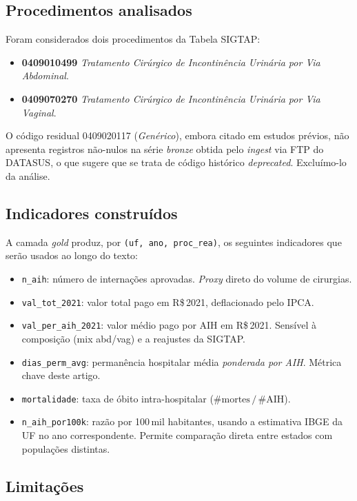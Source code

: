 \documentclass[12pt,a4paper,oneside]{article}
\newcommand{\rs}{R\$\,}
\begin{document}
\subsection{Procedimentos analisados}

Foram considerados dois procedimentos da Tabela SIGTAP:
\begin{itemize}
\item \textbf{0409010499} \textemdash{} \textit{Tratamento
Cirúrgico de Incontinência Urinária por Via Abdominal}.
\item \textbf{0409070270} \textemdash{} \textit{Tratamento
Cirúrgico de Incontinência Urinária por Via Vaginal}.
\end{itemize}

O código residual 0409020117 (\textit{Genérico}), embora citado
em estudos prévios, não apresenta registros não-nulos na série
\textit{bronze} obtida pelo \textit{ingest} via FTP do DATASUS, o
que sugere que se trata de código histórico \textit{deprecated}.
Excluímo-lo da análise.

\subsection{Indicadores construídos}

A camada \textit{gold} produz, por \texttt{(uf, ano, proc\_rea)},
os seguintes indicadores que serão usados ao longo do texto:

\begin{itemize}
\item \texttt{n\_aih}: número de internações aprovadas. \textit{Proxy}
direto do volume de cirurgias.
\item \texttt{val\_tot\_2021}: valor total pago em \rs 2021,
deflacionado pelo IPCA.
\item \texttt{val\_per\_aih\_2021}: valor médio pago por AIH em
\rs 2021. Sensível à composição (mix abd/vag) e a reajustes da
SIGTAP.
\item \texttt{dias\_perm\_avg}: permanência hospitalar média
\textit{ponderada por AIH}. Métrica chave deste artigo.
\item \texttt{mortalidade}: taxa de óbito intra-hospitalar
($\#\text{mortes}\,/\,\#\text{AIH}$).
\item \texttt{n\_aih\_por100k}: razão por 100\,mil habitantes,
usando a estimativa IBGE da UF no ano correspondente. Permite
comparação direta entre estados com populações distintas.
\end{itemize}

\subsection{Limitações}
\end{document}

